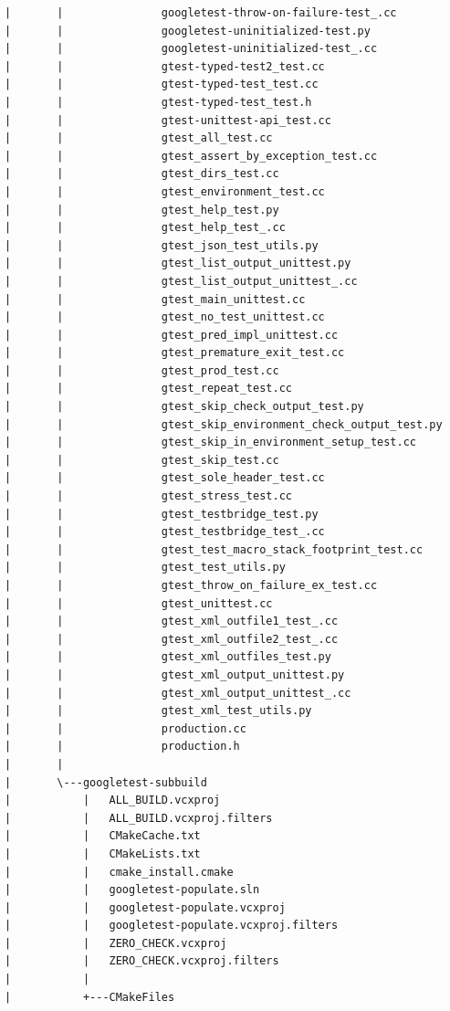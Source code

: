 \documentclass[a4paper,12pt]{article}
\begin{document}
\begin{verbatim}
|       |               googletest-throw-on-failure-test_.cc
|       |               googletest-uninitialized-test.py
|       |               googletest-uninitialized-test_.cc
|       |               gtest-typed-test2_test.cc
|       |               gtest-typed-test_test.cc
|       |               gtest-typed-test_test.h
|       |               gtest-unittest-api_test.cc
|       |               gtest_all_test.cc
|       |               gtest_assert_by_exception_test.cc
|       |               gtest_dirs_test.cc
|       |               gtest_environment_test.cc
|       |               gtest_help_test.py
|       |               gtest_help_test_.cc
|       |               gtest_json_test_utils.py
|       |               gtest_list_output_unittest.py
|       |               gtest_list_output_unittest_.cc
|       |               gtest_main_unittest.cc
|       |               gtest_no_test_unittest.cc
|       |               gtest_pred_impl_unittest.cc
|       |               gtest_premature_exit_test.cc
|       |               gtest_prod_test.cc
|       |               gtest_repeat_test.cc
|       |               gtest_skip_check_output_test.py
|       |               gtest_skip_environment_check_output_test.py
|       |               gtest_skip_in_environment_setup_test.cc
|       |               gtest_skip_test.cc
|       |               gtest_sole_header_test.cc
|       |               gtest_stress_test.cc
|       |               gtest_testbridge_test.py
|       |               gtest_testbridge_test_.cc
|       |               gtest_test_macro_stack_footprint_test.cc
|       |               gtest_test_utils.py
|       |               gtest_throw_on_failure_ex_test.cc
|       |               gtest_unittest.cc
|       |               gtest_xml_outfile1_test_.cc
|       |               gtest_xml_outfile2_test_.cc
|       |               gtest_xml_outfiles_test.py
|       |               gtest_xml_output_unittest.py
|       |               gtest_xml_output_unittest_.cc
|       |               gtest_xml_test_utils.py
|       |               production.cc
|       |               production.h
|       |               
|       \---googletest-subbuild
|           |   ALL_BUILD.vcxproj
|           |   ALL_BUILD.vcxproj.filters
|           |   CMakeCache.txt
|           |   CMakeLists.txt
|           |   cmake_install.cmake
|           |   googletest-populate.sln
|           |   googletest-populate.vcxproj
|           |   googletest-populate.vcxproj.filters
|           |   ZERO_CHECK.vcxproj
|           |   ZERO_CHECK.vcxproj.filters
|           |   
|           +---CMakeFiles

\end{verbatim}
\end{document}
